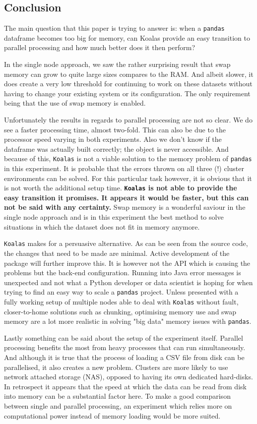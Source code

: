 \subsection{Conclusion}

The main question that this paper is trying to answer is: when a \texttt{pandas} dataframe becomes too big for memory, can Koalas provide an easy transition to parallel processing and how much better does it then perform?

In the single node approach, we saw the rather surprising result that swap memory can grow to quite large sizes compares to the RAM. And albeit slower, it does create a very low threshold for continuing to work on these datasets without having to change your existing system or its configuration. The only requirement being that the use of swap memory is enabled.

Unfortunately the results in regards to parallel processing are not so clear. We do see a faster processing time, almost two-fold. This can also be due to the processor speed varying in both experiments. Also we don't know if the dataframe was actually built correctly; the object is never accessible. And because of this, \texttt{Koalas} is not a viable solution to the memory problem of \texttt{pandas} in this experiment. It is probable that the errors thrown on all three (!) cluster environments can be solved. For this particular task however, it is obvious that it is not worth the additional setup time. \textbf{\texttt{Koalas} is not able to provide the easy transition it promises. It appears it would be faster, but this can not be said with any certainty.} Swap memory is a wonderful saviour in the single node approach and is in this experiment the best method to solve situations in which the dataset does not fit in memory anymore.

\texttt{Koalas} makes for a persuasive alternative. As can be seen from the source code, the changes that need to be made are minimal. Active development of the package will further improve this. It is however not the API which is causing the problems but the back-end configuration. Running into Java error messages is unexpected and not what a Python developer or data scientist is hoping for when trying to find an easy way to scale a \texttt{pandas} project. Unless presented with a fully working setup of multiple nodes able to deal with \texttt{Koalas} without fault, closer-to-home solutions such as chunking, optimising memory use and swap memory are a lot more realistic in solving "big data" memory issues with \texttt{pandas}. 

Lastly something can be said about the setup of the experiment itself. Parallel processing benefits the most from heavy processes that can run simultaneously. And although it is true that the process of loading a CSV file from disk can be parallelised, it also creates a new problem. Clusters are more likely to use network attached storage (NAS), opposed to having its own dedicated hard-disks. In retrospect it appears that the speed at which the data can be read from disk into memory can be a substantial factor here. To make a good comparison between single and parallel processing, an experiment which relies more on computational power instead of memory loading would be more suited.